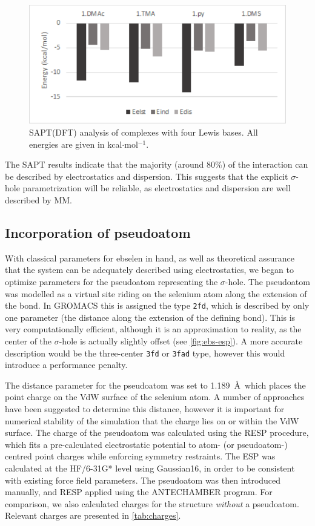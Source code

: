 \begin{refsection}
\begin{figure}
    \centering
    \includegraphics[width=0.55\linewidth]{Figures/sapt-eda.pdf}
    \caption[SAPT(DFT) analysis of complexes with four Lewis bases.]{SAPT(DFT) analysis of complexes with four Lewis bases. All energies are given in kcal$\cdot$mol$^{-1}$.}\label{fig:eda}
\end{figure}

The SAPT results indicate that the majority (around 80\%) of the interaction can be described by electrostatics and dispersion.
This suggests that the explicit $ \sigma $-hole parametrization will be reliable, as electrostatics and dispersion are well described by MM.\@

\subsection{Incorporation of pseudoatom}
With classical parameters for ebselen in hand, as well as theoretical assurance that the system can be adequately described using electrostatics, we began to optimize parameters for the pseudoatom representing the $ \sigma $-hole.
The pseudoatom was modelled as a virtual site riding on the selenium atom along the extension of the  bond.
In GROMACS this is assigned the type \texttt{2fd}, which is described by only one parameter (the distance along the extension of the defining bond).
This is very computationally efficient, although it is an approximation to reality, as the center of the $ \sigma $-hole is actually slightly offset (see \cref{fig:ebs-esp}).
A more accurate description would be the three-center \texttt{3fd} or \texttt{3fad} type, however this would introduce a performance penalty.

The distance parameter for the pseudoatom was set to 1.189~\AA\ which places the point charge on the VdW surface of the selenium atom.
A number of approaches have been suggested to determine this distance, however it is important for numerical stability of the simulation that the charge lies on or within the VdW surface.\autocite{Hobza2012}
The charge of the pseudoatom was calculated using the RESP procedure, which fits a pre-calculated electrostatic potential to atom- (or pseudoatom-) centred point charges while enforcing symmetry restraints.
The ESP was calculated at the HF/6-31G* level using Gaussian16, in order to be consistent with existing force field parameters.
The pseudoatom was then introduced manually, and RESP applied using the ANTECHAMBER program.
For comparison, we also calculated charges for the structure \emph{without} a pseudoatom.
Relevant charges are presented in \cref{tab:charges}.


\end{refsection}
